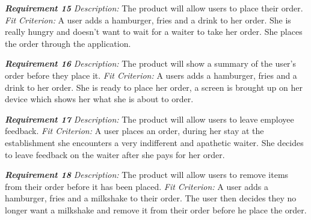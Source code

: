\documentclass[12pt, titlepage]{article}
\begin{document}
\textbf{\textit{Requirement 15}}\newline
\textit{Description:}\newline
The product will allow users to place their order. \newline\newline
\textit{Fit Criterion:}\newline 
A user adds a hamburger, fries and a drink to her order. She is really hungry and doesn't want to wait for a waiter to take her order. She places the order through the application.
\newline

\textbf{\textit{Requirement 16}}\newline
\textit{Description:}\newline
The product will show a summary of the user's order before they place it. \newline\newline
\textit{Fit Criterion:}\newline 
A users adds a hamburger, fries and a drink to her order. She is ready to place her order, a screen is brought up on her device which shows her what she is about to order.
\newline

\textbf{\textit{Requirement 17}}\newline
\textit{Description:}\newline
The product will allow users to leave employee feedback. \newline\newline
\textit{Fit Criterion:}\newline 
A user places an order, during her stay at the establishment she encounters a very indifferent and apathetic waiter. She decides to leave feedback on the waiter after she pays for her order.
\newline

\textbf{\textit{Requirement 18}}\newline
\textit{Description:}\newline
The product will allow users to remove items from their order before it has been placed. \newline\newline
\textit{Fit Criterion:}\newline 
A user adds a hamburger, fries and a milkshake to their order. The user then decides they no longer want a milkshake and remove it from their order before he place the order.
\newline
\end{document}
